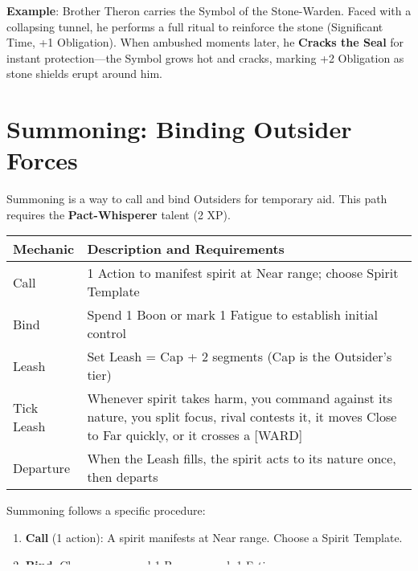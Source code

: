 \textbf{Example}: Brother Theron carries the Symbol of the Stone-Warden. Faced with a collapsing tunnel, he performs a full ritual to reinforce the stone (Significant Time, +1 Obligation). When ambushed moments later, he \textbf{Cracks the Seal} for instant protection—the Symbol grows hot and cracks, marking +2 Obligation as stone shields erupt around him.

\section*{Summoning: Binding Outsider Forces}

Summoning is a way to call and bind Outsiders for temporary aid. This path requires the \textbf{Pact-Whisperer} talent (2 XP).

\begin{fatebox}
\begin{tabularx}{\textwidth}{lX}
\toprule
\textbf{Mechanic} & \textbf{Description and Requirements} \\
\midrule
Call & 1 Action to manifest spirit at Near range; choose Spirit Template \\
Bind & Spend 1 Boon or mark 1 Fatigue to establish initial control \\
Leash & Set Leash = Cap + 2 segments (Cap is the Outsider's tier) \\
Tick Leash & Whenever spirit takes harm, you command against its nature, you split focus, rival contests it, it moves Close to Far quickly, or it crosses a [WARD] \\
Departure & When the Leash fills, the spirit acts to its nature once, then departs \\
\bottomrule
\end{tabularx}
\end{fatebox}

Summoning follows a specific procedure:
\begin{enumerate}
    \item \textbf{Call} (1 action): A spirit manifests at Near range. Choose a Spirit Template.
    \item \textbf{Bind}: Choose one: spend 1 Boon or mark 1 Fatigue.
    \item \textbf{Leash}: Set Leash = Cap + 2 segments.
    \item \textbf{Command}: Issue orders each round; inappropriate commands tick Leash.
    \item \textbf{Maintain}: Keep focus on the spirit or risk Leash ticks.
    \item \textbf{Departure}: When Leash fills, spirit acts to nature once then departs.
\end{enumerate}

